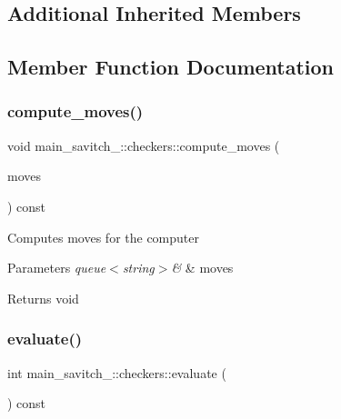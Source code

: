 \subsection*{Additional Inherited Members}


\subsection{Member Function Documentation}
\mbox{\label{classmain__savitch__14_1_1checkers_aa4b4867ee171d04f5473f4ca38a9729a}} 
\subsubsection{\texorpdfstring{compute\+\_\+moves()}{compute\_moves()}}
{\footnotesize\ttfamily void main\+\_\+savitch\+\_\+::checkers\+::compute\+\_\+moves (\begin{DoxyParamCaption}\item[{queue$<$ string $>$ \&}]{moves }\end{DoxyParamCaption}) const}

Computes moves for the computer 
\begin{DoxyParams}{Parameters}
{\em queue$<$string$>$\&} & moves \\
\hline
\end{DoxyParams}
\begin{DoxyReturn}{Returns}
void 
\end{DoxyReturn}
\mbox{\label{classmain__savitch__14_1_1checkers_a1705b4e1bfe04205ebb7703925b50f9f}} 
\subsubsection{\texorpdfstring{evaluate()}{evaluate()}}
{\footnotesize\ttfamily int main\+\_\+savitch\+\_\+::checkers\+::evaluate (\begin{DoxyParamCaption}{ }\end{DoxyParamCaption}) const\hspace{0.3cm}{\ttfamily [virtual]}}

